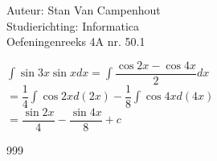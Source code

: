 \documentclass[a4paper]{article}
\begin{document}
  
\noindent \large Auteur: Stan Van Campenhout \\
\noindent \large Studierichting:  Informatica\\
\noindent \large Oefeningenreeks 4A nr. 50.1\\

\medskip

\normalsize

$ \displaystyle\int\sin 3x\sin xdx = \displaystyle\int\dfrac{\cos 2x-\cos 4x}{2}dx $\\

$ = \dfrac{1}{4}\displaystyle\int\cos 2xd\left(2x\right) -\dfrac{1}{8}\displaystyle\int\cos 4xd\left(4x\right) $\\

$ = \dfrac{\sin 2x}{4} - \dfrac{\sin 4x}{8} + c $\\

\begin{thebibliography}{999}
\end{thebibliography}
\end{document}

